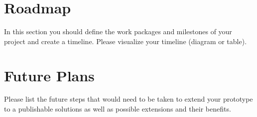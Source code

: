 \documentclass{scrarticle}
\begin{document}
	\section{Roadmap}
	
	In this section you should define the work packages and milestones of your project and create a timeline. Please visualize your timeline (diagram or table).
	
	\section{Future Plans}
	
	Please list the future steps that would need to be taken to extend your prototype to a publishable solutions as well as possible extensions and their benefits.
	
	\newpage
	
	
	
\end{document}
